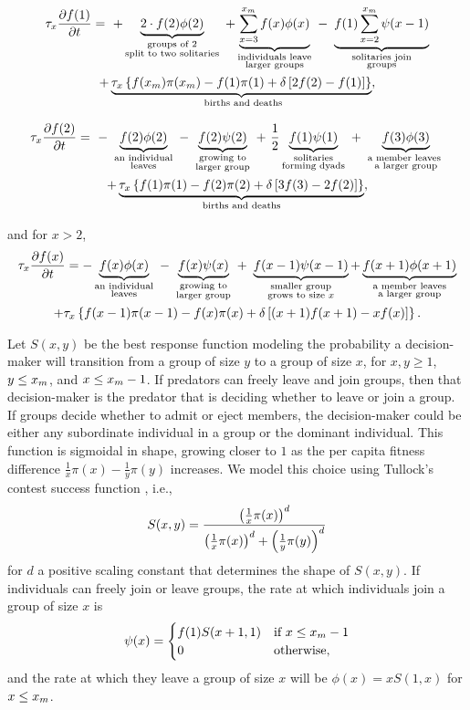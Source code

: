 \begin{multline} \label{df_of_1}
\tau_x \pdv{f(1)}{t} =\ + \underbracetwo{2 \cdot f(2) \phi(2)}{groups of 2}{split to two solitaries} \ +  \underbracetwo{\sum_{x=3}^{\xm} f(x) \phi(x)}{individuals leave}{larger groups}\ 
 -\  \underbracetwo{ f(1) \sum_{x=2}^{\xm} \psi(x-1)}{solitaries join}{groups}  \\+  \underbracetwo{\tau_x \lrc{ f(x_m) \pi (x_m ) - f(1) \pi(1) + \delta \lrb{2f(2) - f(1)}}}{ births and deaths}{},
\end{multline}
\begin{multline} \label{df_dt_2}
\tau_x \pdv{f(2)}{t} = \ -\  \underbracetwo{f(2) \phi(2)}{an individual}{leaves} 
\ - \ \underbracetwo{f(2) \psi(2) }{growing to}{larger group} \ +\  \frac{1}{2} \underbracetwo{f(1) \psi(1)}{solitaries}{forming dyads}\ +\ \underbracetwo{f(3)\phi(3)}{a member leaves }{a larger group}\\
+ \underbracetwo{ \tau_x \lrc{f(1) \pi(1) - f(2) \pi(2) + \delta \lrb{ 3 f(3) - 2 f(2)  } } }{births and deaths}{},
\end{multline}
and for $x > 2$,
\begin{multline} \label{df_dt}
\tau_x \pdv{f(x)}{t} = -\underbrace{  f(x) \phi(x) }_{\substack{\text{an individual} \\ \text{leaves} } } \ - \ \underbrace{f(x) \psi(x) }_{\substack{\text{growing to} \\ \text{larger group} } } \ +\ \underbrace{f(x-1)\psi(x-1)}_{\substack{\text{smaller group} \\ \text{grows to size $x$} } } + \underbrace{f(x+1)\phi(x+1)}_{\substack{\text{a member leaves} \\ \text{a larger group} } }\\
+ \tau_x \left\{  f(x-1)\pi(x-1) - f(x) \pi(x) + \delta \left[ (x+1)f(x+1) - xf(x) \right]  \right\}.
\end{multline}

Let $S(x,y)$ be the best response function modeling the probability a decision-maker will transition from a group of size $y$ to a group of size $x$, for $x,y \geq 1$, $y \leq x_{m}$, and $x \leq x_{m} - 1$. If predators can freely leave and join groups, then that decision-maker is the predator that is deciding whether to leave or join a group. If groups decide whether to admit or eject members, the decision-maker could be either any subordinate individual in a group or the dominant individual. This function is sigmoidal in shape, growing closer to $1$ as the per capita fitness difference $\frac{1}{x} \pi(x) - \frac{1}{y}\pi(y)$ increases. We model this choice using Tullock's contest success function \cite{tullock_efficient_1980}, i.e.,
\begin{equation} \label{best_response_function}
S(x,y) = \frac{\left( \frac{1}{x}\pi(x) \right)^d}{\left( \frac{1}{x} \pi(x) \right)^d + \left( \frac{1}{y}\pi(y) \right)^d}
\end{equation}
for $d$ a positive scaling constant that determines the shape of $S(x,y)$. If individuals can freely join or leave groups, the rate at which individuals join a group of size $x$ is
\begin{equation}
\psi(x) = 
\begin{cases}
f(1) S(x+1,1)  & \text{if } x \leq x_{m} - 1 \\
0 & \text{otherwise},
\end{cases}
\end{equation}
and the rate at which they leave a group of size $x$ will be $\phi(x) = xS(1,x)$ for $x \leq x_{m}$.  

